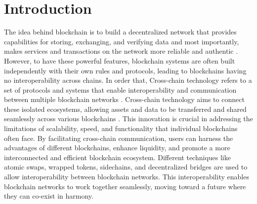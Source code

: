 \documentclass[sigconf]{acmart}
\begin{document}
\section{Introduction}
The idea behind blockchain is to build a decentralized network that provides capabilities for storing, exchanging, and verifying data and most importantly, makes services and transactions on the network more reliable and authentic \cite{Patel_Patel_2023, Kumarathunga_Calheiros_Ginige_2022}. However, to have these powerful features, blockchain systems are often built independently with their own rules and protocols, leading to blockchains having no interoperability across chains. In order that, Cross-chain technology refers to a set of protocols and systems that enable interoperability and communication between multiple blockchain networks \cite{xie2022zkbridge}. Cross-chain technology aims to connect these isolated ecosystems, allowing assets and data to be transferred and shared seamlessly across various blockchains \cite{lan2021horizon}. This innovation is crucial in addressing the limitations of scalability, speed, and functionality that individual blockchains often face. By facilitating cross-chain communication, users can harness the advantages of different blockchains, enhance liquidity, and promote a more interconnected and efficient blockchain ecosystem. Different techniques like atomic swaps, wrapped tokens, sidechains, and decentralized bridges are used to allow interoperability between blockchain networks. This interoperability enables blockchain networks to work together seamlessly, moving toward a future where they can co-exist in harmony.
\end{document}
